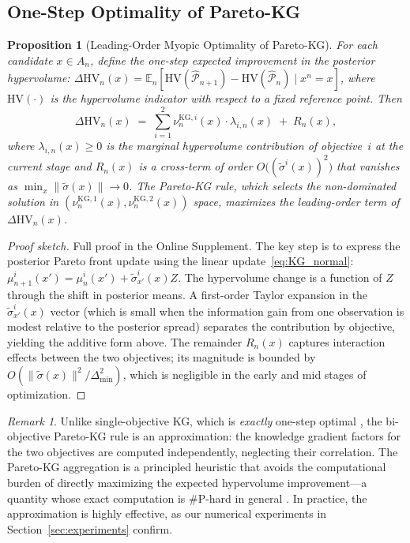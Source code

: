 \documentclass[12pt]{article}
\theoremstyle{plain}
\newtheorem{proposition}{Proposition}[section]
\theoremstyle{definition}
\theoremstyle{remark}
\newtheorem{remark}{Remark}[section]
\begin{document}
\subsection{One-Step Optimality of Pareto-KG}\label{sec:kg-optimality}

\begin{proposition}[Leading-Order Myopic Optimality of Pareto-KG]\label{prop:kg-optimal}
For each candidate $x \in A_n$, define the one-step expected improvement in
the posterior hypervolume:
$\Delta\mathrm{HV}_{n}(x) = \mathbb{E}_{n}[\mathrm{HV}(\hat{\mathcal{P}}_{n+1})
- \mathrm{HV}(\hat{\mathcal{P}}_{n}) \mid x^{n}=x]$,
where $\mathrm{HV}(\cdot)$ is the hypervolume indicator with respect to a
fixed reference point.  Then
\[
  \Delta\mathrm{HV}_{n}(x)
  \;=\;
  \sum_{i=1}^{2}\nu_{n}^{\mathrm{KG},i}(x)\cdot\lambda_{i,n}(x)
  \;+\;
  R_{n}(x),
\]
where $\lambda_{i,n}(x) \geq 0$ is the marginal hypervolume contribution of
objective~$i$ at the current stage and $R_{n}(x)$ is a cross-term of order
$O\!\bigl((\tilde{\sigma}^{i}(x))^{2}\bigr)$ that vanishes as
$\min_x\lVert\tilde{\sigma}(x)\rVert \to 0$.  The Pareto-KG rule, which
selects the non-dominated solution in
$(\nu_{n}^{\mathrm{KG},1}(x), \nu_{n}^{\mathrm{KG},2}(x))$ space,
maximizes the leading-order term of $\Delta\mathrm{HV}_{n}(x)$.
\end{proposition}

\begin{proof}[Proof sketch]
Full proof in the Online Supplement.
The key step is to express the posterior Pareto front update using the
linear update~\eqref{eq:KG_normal}: $\mu^i_{n+1}(x') = \mu^i_n(x') +
\tilde{\sigma}^i_{x'}(x) Z$.  The hypervolume change is a function of
$Z$ through the shift in posterior means.  A first-order Taylor expansion
in the $\tilde{\sigma}^i_{x'}(x)$ vector (which is small when the
information gain from one observation is modest relative to the posterior
spread) separates the contribution by objective, yielding the additive form
above.  The remainder $R_n(x)$ captures interaction effects between the two
objectives; its magnitude is bounded by
$O(\lVert\tilde{\sigma}(x)\rVert^{2}/\Delta_{\min}^{2})$, which is
negligible in the early and mid stages of optimization.
\end{proof}

\begin{remark}\label{rem:kg-approximate}
Unlike single-objective KG, which is \emph{exactly} one-step optimal
\citep{Frazier2008}, the bi-objective Pareto-KG rule is an
approximation: the knowledge gradient factors for the two objectives are
computed independently, neglecting their correlation.  The Pareto-KG
aggregation is a principled heuristic that avoids the computational burden
of directly maximizing the expected hypervolume improvement---a quantity
whose exact computation is \#P-hard in general
\citep{Bringmann2010}.  In practice, the approximation is highly
effective, as our numerical experiments in Section~\ref{sec:experiments}
confirm.
\end{remark}
\end{document}
